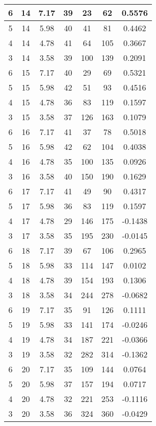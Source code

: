 \documentclass[letterpaper, 12pt]{article}
\begin{document}
\begin{longtable}{|c|c|c|c|c|c|c|}
\hline
6 & 14 & 7.17 & 39 & 23 & 62 & 0.5576 \\
\hline
5 & 14 & 5.98 & 40 & 41 & 81 & 0.4462 \\
\hline
4 & 14 & 4.78 & 41 & 64 & 105 & 0.3667 \\
\hline
3 & 14 & 3.58 & 39 & 100 & 139 & 0.2091 \\
\hline
6 & 15 & 7.17 & 40 & 29 & 69 & 0.5321 \\
\hline
5 & 15 & 5.98 & 42 & 51 & 93 & 0.4516 \\
\hline
4 & 15 & 4.78 & 36 & 83 & 119 & 0.1597 \\
\hline
3 & 15 & 3.58 & 37 & 126 & 163 & 0.1079 \\
\hline
6 & 16 & 7.17 & 41 & 37 & 78 & 0.5018 \\
\hline
5 & 16 & 5.98 & 42 & 62 & 104 & 0.4038 \\
\hline
4 & 16 & 4.78 & 35 & 100 & 135 & 0.0926 \\
\hline
3 & 16 & 3.58 & 40 & 150 & 190 & 0.1629 \\
\hline
6 & 17 & 7.17 & 41 & 49 & 90 & 0.4317 \\
\hline
5 & 17 & 5.98 & 36 & 83 & 119 & 0.1597 \\
\hline
4 & 17 & 4.78 & 29 & 146 & 175 & -0.1438 \\
\hline
3 & 17 & 3.58 & 35 & 195 & 230 & -0.0145 \\
\hline
6 & 18 & 7.17 & 39 & 67 & 106 & 0.2965 \\
\hline
5 & 18 & 5.98 & 33 & 114 & 147 & 0.0102 \\
\hline
4 & 18 & 4.78 & 39 & 154 & 193 & 0.1306 \\
\hline
3 & 18 & 3.58 & 34 & 244 & 278 & -0.0682 \\
\hline
6 & 19 & 7.17 & 35 & 91 & 126 & 0.1111 \\
\hline
5 & 19 & 5.98 & 33 & 141 & 174 & -0.0246 \\
\hline
4 & 19 & 4.78 & 34 & 187 & 221 & -0.0366 \\
\hline
3 & 19 & 3.58 & 32 & 282 & 314 & -0.1362 \\
\hline
6 & 20 & 7.17 & 35 & 109 & 144 & 0.0764 \\
\hline
5 & 20 & 5.98 & 37 & 157 & 194 & 0.0717 \\
\hline
4 & 20 & 4.78 & 32 & 221 & 253 & -0.1116 \\
\hline
3 & 20 & 3.58 & 36 & 324 & 360 & -0.0429 \\
\hline
\end{longtable}
\end{document}
